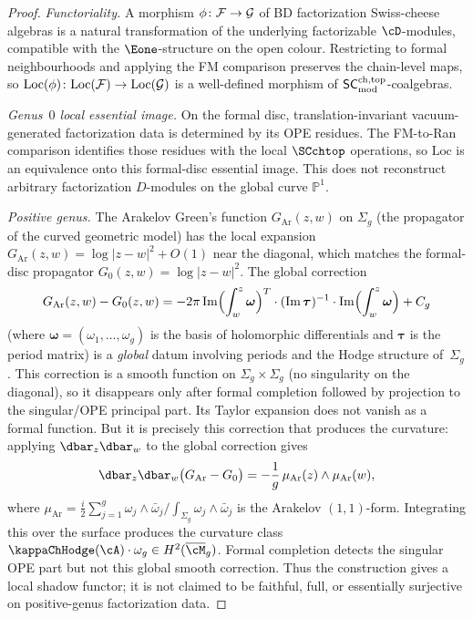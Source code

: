 \begin{proof}
\emph{Functoriality.}
A morphism $\phi \colon \mathcal{F} \to \mathcal{G}$ of BD factorization
Swiss-cheese algebras is a natural transformation of the
underlying factorizable $\cD$-modules, compatible with the
$\Eone$-structure on the open colour. Restricting to formal
neighbourhoods and applying the FM comparison preserves
the chain-level maps, so
$\mathrm{Loc}(\phi) \colon \mathrm{Loc}(\mathcal{F})
\to \mathrm{Loc}(\mathcal{G})$
is a well-defined morphism of $\mathsf{SC}^{\mathrm{ch,top}}_{\mathrm{mod}}$-coalgebras.

\medskip\noindent
\emph{Genus~$0$ local essential image.}
On the formal disc, translation-invariant vacuum-generated
factorization data is determined by its OPE residues. The
FM-to-Ran comparison identifies those residues with the local
$\SCchtop$ operations, so $\mathrm{Loc}$ is an equivalence onto
this formal-disc essential image. This does not reconstruct
arbitrary factorization $D$-modules on the global curve
$\mathbb{P}^1$.

\medskip\noindent
\emph{Positive genus.}
The Arakelov Green's function $G_{\mathrm{Ar}}(z,w)$ on
$\Sigma_g$ (the propagator of the curved geometric model)
has the local expansion
$G_{\mathrm{Ar}}(z,w) = \log|z - w|^2 + O(1)$ near the diagonal,
which matches the formal-disc propagator
$G_0(z,w) = \log|z-w|^2$. The global correction
\[
 G_{\mathrm{Ar}}(z,w) - G_0(z,w)
 = -2\pi \operatorname{Im}
 \Bigl(\int_w^z \boldsymbol{\omega}\Bigr)^T
 \cdot (\operatorname{Im} \boldsymbol{\tau})^{-1}
 \cdot \operatorname{Im}
 \Bigl(\int_w^z \boldsymbol{\omega}\Bigr)
 + C_g
\]
(where $\boldsymbol{\omega} = (\omega_1, \ldots, \omega_g)$
is the basis of holomorphic differentials and
$\boldsymbol{\tau}$ is the period matrix) is a \emph{global}
datum involving periods and the Hodge structure of~$\Sigma_g$.
This correction is a smooth function on
$\Sigma_g \times \Sigma_g$ (no singularity on the diagonal),
so it disappears only after formal completion followed by projection
to the singular/OPE principal part. Its Taylor expansion does not
vanish as a formal function. But it is
precisely this correction that produces the curvature:
applying $\dbar_z \dbar_w$ to the global correction gives
\[
 \dbar_z \dbar_w \bigl(G_{\mathrm{Ar}} - G_0\bigr)
 = -\frac{1}{g}\, \mu_{\mathrm{Ar}}(z) \wedge \mu_{\mathrm{Ar}}(w),
\]
where $\mu_{\mathrm{Ar}} = \frac{i}{2}
\sum_{j=1}^g \omega_j \wedge \bar{\omega}_j / \int_{\Sigma_g}
\omega_j \wedge \bar{\omega}_j$ is the Arakelov $(1,1)$-form.
Integrating this over the surface produces the curvature class
$\kappaChHodge(\cA) \cdot \omega_g \in H^2(\overline{\cM}_g)$.
Formal completion detects the singular OPE part but not this
global smooth correction. Thus the construction gives a local
shadow functor; it is not claimed to be faithful, full, or
essentially surjective on positive-genus factorization data.
\end{proof}


